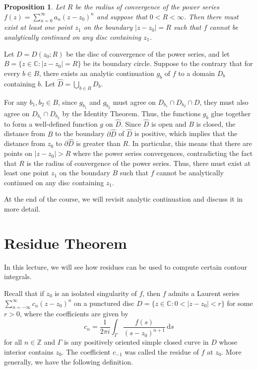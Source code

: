 \documentclass[10pt]{article}
\makeatletter
\newcommand{\C}{\mathbb{C}}
\newcommand{\Z}{\mathbb{Z}}
\newcommand{\dd}{\,\mathrm{d}}
\theoremstyle{newstyle}
\newtheorem{prop}[thm]{Proposition}
\newenvironment{pf}[1][\proofname]{\par
  \pushQED{\qed}%
  \normalfont \topsep0\p@\relax
  \trivlist
  \item[\hskip\labelsep\scshape
  #1\@addpunct{.}]\ignorespaces
}{%
  \popQED\endtrivlist\@endpefalse
}
\makeatother
\begin{document}
\begin{prop}
Let $R$ be the radius of convergence of the power series $f(z) = \sum_{n=0}^\infty a_n(z-z_0)^n$ 
and suppose that $0 < R < \infty$. Then there must exist at least one point 
$z_1$ on the boundary $|z-z_0| = R$ such that $f$ cannot be analytically continued on 
any disc containing $z_1$. 
\end{prop}
\begin{pf}
Let $D = D(z_0; R)$ be the disc of convergence of the power series, and let 
$B = \{z \in \C : |z-z_0| = R\}$ be its boundary circle. Suppose to the contrary that 
for every $b \in B$, there exists an analytic continuation $g_b$ of $f$ to a domain 
$D_b$ containing $b$. Let $\hat D = \bigcup_{b\in B} D_b$. 

For any $b_1, b_2 \in B$, since $g_{b_1}$ and $g_{b_2}$ must agree on $D_{b_1} \cap D_{b_2} \cap D$, 
they must also agree on $D_{b_1} \cap D_{b_2}$ by the Identity Theorem. Thus, the functions 
$g_b$ glue together to form a well-defined function $g$ on $\hat D$. Since $\hat D$ is 
open and $B$ is closed, the distance from $B$ to the boundary $\partial \hat D$ of $\hat D$ 
is positive, which implies that the distance from $z_0$ to $\partial \hat D$ is greater than $R$. 
In particular, this means that there are points on $|z-z_0| > R$ where the power series 
convergences, contradicting the fact that $R$ is the radius of convergence of the power series. 
Thus, there must exist at least one point $z_1$ on the boundary $B$ such that $f$ 
cannot be analytically continued on any disc containing $z_1$. 
\end{pf}

At the end of the course, we will revisit analytic continuation and discuss it in more detail. 

\newpage 
\section{Residue Theorem}

In this lecture, we will see how residues can be used to compute certain contour integrals. 

Recall that if $z_0$ is an isolated singularity of $f$, then $f$ admits a Laurent series 
$\sum_{n=-\infty}^\infty c_n(z-z_0)^n$ on a punctured disc $D = \{z \in \C : 0 < 
|z - z_0| < r\}$ for some $r > 0$, where the coefficients are given by 
\[ c_n = \frac{1}{2\pi i} \int_\Gamma \frac{f(s)}{(s-z_0)^{n+1}}\dd s \]
for all $n \in \Z$ and $\Gamma$ is any positively oriented simple closed curve in $D$ whose 
interior contains $z_0$. The coefficient $c_{-1}$ was called the residue of $f$ at $z_0$. 
More generally, we have the following definition. 
\end{document}

